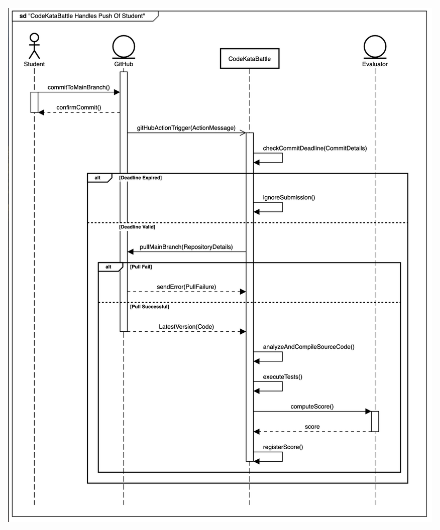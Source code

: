\documentclass{Configuration_Files/Template}
\begin{document}
\begin{figure}[H]
\includegraphics[scale = 0.45]{Images/SequenceDiagrams/StudentPushHandlerSeqDiagram.png}\\
\centering
\end{figure}
\end{document}
